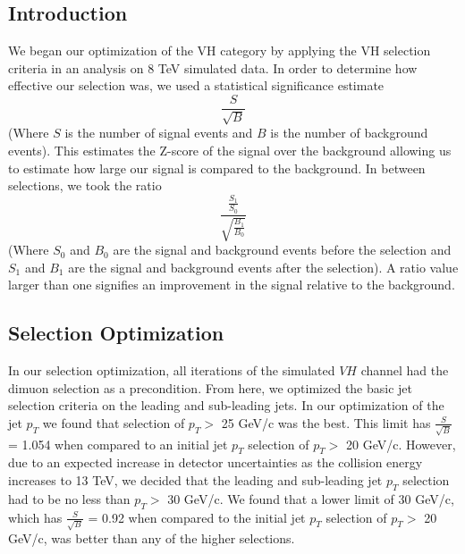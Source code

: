\documentclass[12pt]{article}
\begin{document}
\subsection{Introduction}

We began our optimization of the VH category by applying the VH selection criteria in an analysis on 8 TeV simulated data. 
In order to determine how effective our selection was, we used a statistical significance estimate 
	\[\frac{S}{\sqrt{B}} \] 
(Where $S$ is the number of signal events and $B$ is the number of background events). 
This estimates the Z-score of the signal over the background allowing us to estimate how large our signal is compared to the background. 
In between selections, we took the ratio 
	\[\frac{\frac{S_{1}}{S_{0}}}{\sqrt{\frac{B_{1}}{B_{0}}}} \] 
(Where $S_{0}$ and $B_{0}$ are the signal and background events before the selection 
and $S_{1}$ and $B_{1}$ are the signal and background events after the selection). 
A ratio value larger than one signifies an improvement in the signal relative to the background.

\subsection{Selection Optimization}

In our selection optimization, all iterations of the simulated $VH$ channel had the dimuon selection as a precondition. 
From here, we optimized the basic jet selection criteria on the leading and sub-leading jets. 
In our optimization of the jet $p_{T}$ we found that selection of $p_{T}>$ 25 GeV/c was the best. 
This limit has $\frac{S}{\sqrt{B}}$ = 1.054 when compared to an initial jet $p_{T}$ selection of $p_{T}>$ 20 GeV/c. 
However, due to an expected increase in detector uncertainties as the collision energy increases to 13 TeV, 
we decided that the leading and sub-leading jet $p_{T}$ selection had to be no less than $p_{T}>$ 30 GeV/c. 
We found that a lower limit of 30 GeV/c, which has $\frac{S}{\sqrt{B}}$ = 0.92 when compared to the initial jet $p_{T}$ selection of $p_{T}>$ 20 GeV/c, 
was better than any of the higher selections. 
\end{document}
